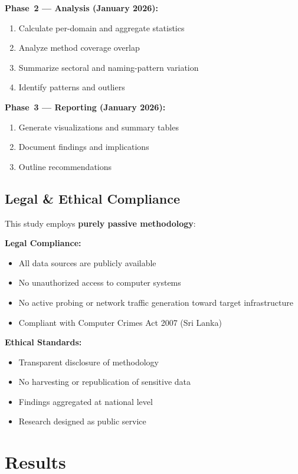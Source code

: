 \documentclass[preprint,review,12pt]{elsarticle}
\begin{document}
\textbf{Phase~2 --- Analysis (January 2026):}
\begin{enumerate}
    \item Calculate per-domain and aggregate statistics
    \item Analyze method coverage overlap
    \item Summarize sectoral and naming-pattern variation
    \item Identify patterns and outliers
\end{enumerate}

\textbf{Phase~3 --- Reporting (January 2026):}
\begin{enumerate}
    \item Generate visualizations and summary tables
    \item Document findings and implications
    \item Outline recommendations
\end{enumerate}

\subsection{Legal \& Ethical Compliance}

This study employs \textbf{purely passive methodology}:

\textbf{Legal Compliance:}
\begin{itemize}
    \item All data sources are publicly available
    \item No unauthorized access to computer systems
    \item No active probing or network traffic generation toward target infrastructure
    \item Compliant with Computer Crimes Act 2007 (Sri Lanka)
\end{itemize}

\textbf{Ethical Standards:}
\begin{itemize}
    \item Transparent disclosure of methodology
    \item No harvesting or republication of sensitive data
    \item Findings aggregated at national level
    \item Research designed as public service
\end{itemize}

\section{Results}
\label{sec:results}
\end{document}
